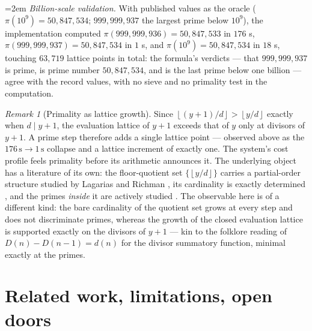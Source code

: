 \documentclass[11pt]{article}
\theoremstyle{remark}
\newtheorem{remark}{Remark}
\newcommand{\fl}[1]{\left\lfloor #1 \right\rfloor}
\begin{document}
{\emergencystretch=2em
\emph{Billion-scale validation.} With published values as the oracle
($\pi(10^9) = 50{,}847{,}534$; $999{,}999{,}937$ the largest prime below $10^9$), the implementation
computed $\pi(999{,}999{,}936) = 50{,}847{,}533$ in $176$ s, $\pi(999{,}999{,}937) = 50{,}847{,}534$ in
$1$ s, and $\pi(10^9) = 50{,}847{,}534$ in $18$ s, touching $63{,}719$ lattice points in total: the
formula's verdicts --- that $999{,}999{,}937$ is prime, is prime number $50{,}847{,}534$, and is the
last prime below one billion --- agree with the record values, with no sieve and no primality test in
the computation.\par}

\begin{remark}[Primality as lattice growth]
Since $\fl{(y+1)/d} > \fl{y/d}$ exactly when $d \mid y+1$, the evaluation lattice of $y+1$ exceeds that
of $y$ only at divisors of $y+1$. A prime step therefore adds a single lattice point --- observed above
as the $176\,\mathrm{s} \to 1\,\mathrm{s}$ collapse and a lattice increment of exactly one. The
system's cost profile feels primality before its arithmetic announces it. The underlying object has a
literature of its own: the floor-quotient set $\{\fl{y/d}\}$ carries a partial-order structure studied
by Lagarias and Richman \cite{LR}, its cardinality is exactly determined \cite{Heyman}, and the primes
\emph{inside} it are actively studied \cite{HeymanP,MaWu}. The observable here is of a different kind:
the bare cardinality of the quotient set grows at every step and does not discriminate primes, whereas
the growth of the closed evaluation lattice is supported exactly on the divisors of $y+1$ --- kin to
the folklore reading of $D(n) - D(n-1) = d(n)$ for the divisor summatory function, minimal exactly at
the primes.
\end{remark}

\section{Related work, limitations, open doors}
\end{document}
